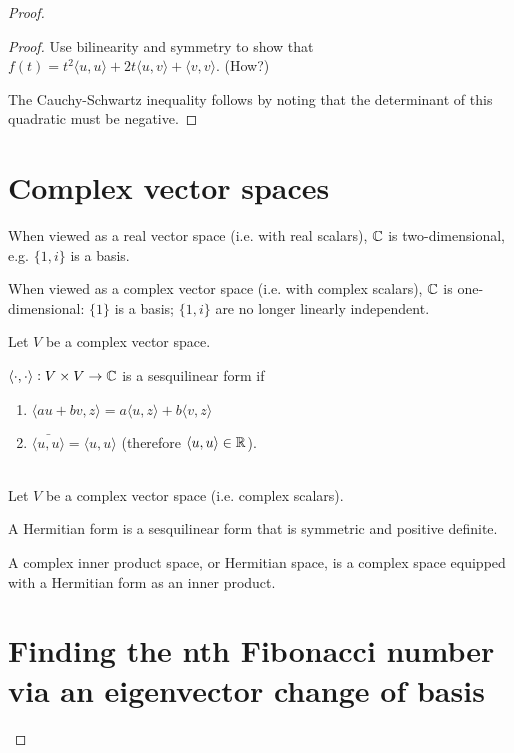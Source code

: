 \begin{proof}
\begin{proof}
  Use bilinearity and symmetry to show that
  $f(t) = t^2 \langle u, u \rangle + 2t \langle u, v \rangle + \langle v, v \rangle$. (How?)

  The Cauchy-Schwartz inequality follows by noting that the determinant of this quadratic must be
  negative.
\end{proof}

\section{Complex vector spaces}
When viewed as a real vector space (i.e. with real scalars), $\mathbb{C}$ is
two-dimensional, e.g. $\{1, i\}$ is a basis.

When viewed as a complex vector space (i.e. with complex scalars), $\mathbb{C}$ is one-dimensional: $\{1\}$
is a basis; $\{1, i\}$ are no longer linearly independent.


\begin{definition*}
  Let $V$ be a complex vector space.

  $\langle \cdot, \cdot \rangle:V \times V \to \mathbb{C}$ is a sesquilinear form if
  \begin{enumerate}
  \item $\langle au + bv, z \rangle = a\langle u, z \rangle + b\langle v, z \rangle$
  \item $\bar{\langle u, u \rangle} = \langle u, u \rangle$ (therefore
    $\langle u, u \rangle \in \mathbb{R}$).
  \end{enumerate}
\end{definition*}


\begin{definition*}~\\
  Let $V$ be a complex vector space (i.e. complex scalars).

  A Hermitian form is a sesquilinear form that is symmetric and positive definite.

  A complex inner product space, or Hermitian space, is a complex space equipped with a Hermitian
  form as an inner product.
\end{definition*}


\section{Finding the nth Fibonacci number via an eigenvector change of basis}



\end{proof}
